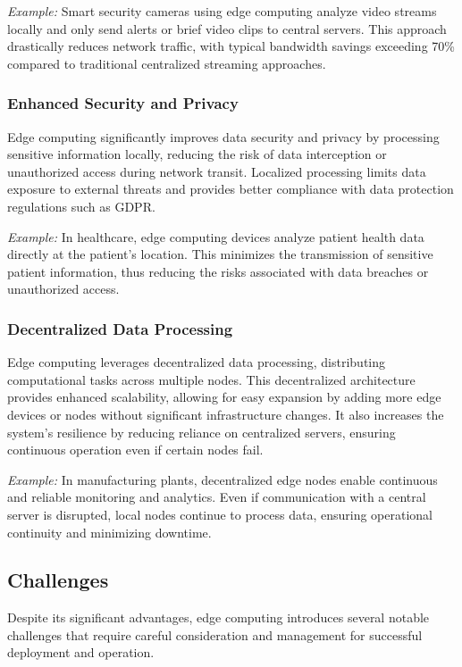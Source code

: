 \documentclass[runningheads]{llncs}
\begin{document}
\textit{Example:} Smart security cameras using edge computing analyze video streams locally and only send alerts or brief video clips to central servers. This approach drastically reduces network traffic, with typical bandwidth savings exceeding 70\% compared to traditional centralized streaming approaches.

\subsubsection{Enhanced Security and Privacy}
Edge computing significantly improves data security and privacy by processing sensitive information locally, reducing the risk of data interception or unauthorized access during network transit. Localized processing limits data exposure to external threats and provides better compliance with data protection regulations such as GDPR.

\textit{Example:} In healthcare, edge computing devices analyze patient health data directly at the patient's location. This minimizes the transmission of sensitive patient information, thus reducing the risks associated with data breaches or unauthorized access.

\subsubsection{Decentralized Data Processing}
Edge computing leverages decentralized data processing, distributing computational tasks across multiple nodes. This decentralized architecture provides enhanced scalability, allowing for easy expansion by adding more edge devices or nodes without significant infrastructure changes. It also increases the system’s resilience by reducing reliance on centralized servers, ensuring continuous operation even if certain nodes fail.

\textit{Example:} In manufacturing plants, decentralized edge nodes enable continuous and reliable monitoring and analytics. Even if communication with a central server is disrupted, local nodes continue to process data, ensuring operational continuity and minimizing downtime.


\subsection{Challenges}

Despite its significant advantages, edge computing introduces several notable challenges that require careful consideration and management for successful deployment and operation.
\end{document}
